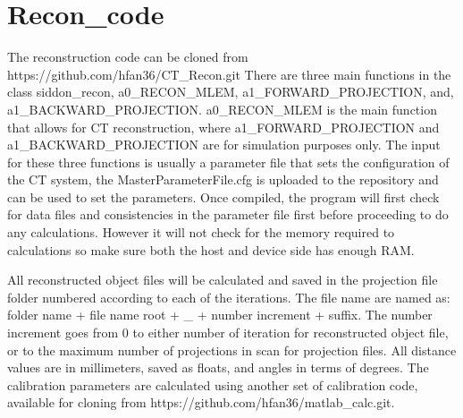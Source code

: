 \chapter{Recon_code}

The reconstruction code can be cloned from https://github.com/hfan36/CT_Recon.git
There are three main functions in the class siddon_recon, a0_RECON_MLEM, a1_FORWARD_PROJECTION, and, a1_BACKWARD_PROJECTION.  a0_RECON_MLEM is the main function that allows for CT reconstruction, where a1_FORWARD_PROJECTION and a1_BACKWARD_PROJECTION are for simulation purposes only.  The input for these three functions is usually a parameter file that sets the configuration of the CT system, the MasterParameterFile.cfg is uploaded to the repository and can be used to set the parameters.  Once compiled, the program will first check for data files and consistencies in the parameter file first before proceeding to do any calculations.  However it will not check for the memory required to calculations so make sure both the host and device side has enough RAM.  

All reconstructed object files will be calculated and saved in the projection file folder numbered according to each of the iterations.  The file name are named as:
folder name + file name root + _ + number increment + suffix.  The number increment goes from 0 to either number of iteration for reconstructed object file, or to the maximum number of projections in scan for projection files.  All distance values are in millimeters, saved as floats, and angles in terms of degrees.  The calibration parameters are calculated using another set of calibration code, available for cloning from https://github.com/hfan36/matlab_calc.git.